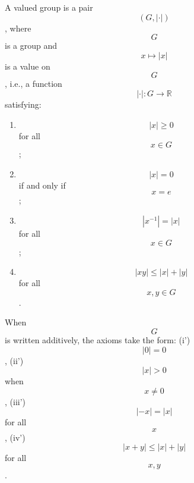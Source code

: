 A valued group is a pair $$(G, |\cdot|)$$, where $$G$$ is a group and $$x \mapsto |x|$$ is a value on $$G$$, i.e., a function $$|\cdot|: G \to \mathbb{R}$$ satisfying:
\begin{enumerate}
\item $$|x| \geq 0$$ for all $$x \in G$$;
\item $$|x| = 0$$ if and only if $$x = e$$;
\item $$|x^{-1}| = |x|$$ for all $$x \in G$$;
\item $$|xy| \leq |x| + |y|$$ for all $$x, y \in G$$.
\end{enumerate}
When $$G$$ is written additively, the axioms take the form: (i') $$|0| = 0$$, (ii') $$|x| > 0$$ when $$x \neq 0$$, (iii') $$|-x| = |x|$$ for all $$x$$, (iv') $$|x + y| \leq |x| + |y|$$ for all $$x, y$$.
